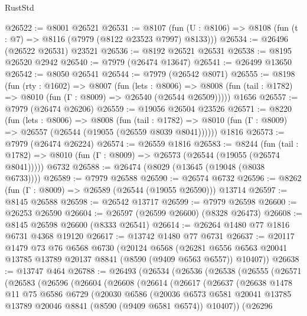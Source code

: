 \begin{lexlean}{RustStd}
\begin{coremodule}
@26522 := @8001 @26521
@26531 := @8107
    (fun (U : @8106) => @8108 (fun (t : @7) => @8116 (@7979 (@8122 @23523 @7997) @8133)))
@26534 := @26496 (@26522 @26531) @23521
@26536 := @8192 @26521 @26531
@26538 := @8195 @26520 @2942
@26540 := @7979 (@26474 @13647)
@26541 := @26499 @13650
@26542 := @8050 @26541
@26544 := @7979 (@26542 @8071)
@26555 := @8198
    (fun (rty : @1602) =>
    @8007
      (fun (lets : @8006) =>
      @8008 (fun (tail : @1782) => @8010 (fun (Γ : @8009) => @26540 (@26544 @26509)))))
    @1656
@26557 := @7979 (@26474 @26206)
@26559 := @19056 @26504 @23526
@26571 := @8220
    (fun (lets : @8006) =>
    @8008
      (fun (tail : @1782) =>
      @8010 (fun (Γ : @8009) => @26557 (@26544 (@19055 (@26559 @8039 @8041))))))
    @1816
@26573 := @7979 (@26474 @26224)
@26574 := @26559 @1816
@26583 := @8244
    (fun (tail : @1782) => @8010 (fun (Γ : @8009) => @26573 (@26544 (@19055 (@26574 @8041)))))
    @6732
@26588 := @26474 (@8029 (@13645 (@19048 (@8038 @6733))))
@26589 := @7979 @26588
@26590 := @26574 @6732
@26596 := @8262 (fun (Γ : @8009) => @26589 (@26544 (@19055 @26590))) @13714
@26597 := @8145 @26588
@26598 := @26542 @13717
@26599 := @7979 @26598
@26600 := @26253 @26590
@26604 := @26597 (@26599 @26600) (@8328 @26473)
@26608 := @8145 @26598 @26600 (@8333 @26541)
@26614 := @26264 @1480 @77 @1816 @6731 @4368 @19120
@26617 := @13742 @1480 @77 @6731
@26637 := @20117
    @1479
    @73
    @76
    @6568
    @6730
    (@20124
      @6568
      (@26281 @6556 @6563 @20041 @13785 @13789 @20137 @8841 (@8590 (@9409 @6563 @6557)) @10407))
@26638 := @13747 @464
@26788 := @26493
    (@26534
      (@26536
        (@26538
          (@26555
            (@26571
              (@26583
                (@26596
                  (@26604
                    (@26608
                      (@26614
                        (@26617
                          (@26637
                            (@26638
                              @1478
                              @11
                              @75
                              @6586
                              @6729
                              (@20030
                                @6586
                                (@20036
                                  @6573
                                  @6581
                                  @20041
                                  @13785
                                  @13789
                                  @20046
                                  @8841
                                  (@8590 (@9409 @6581 @6574))
                                  @10407))
                              (@26296

\end{coremodule}
\end{lexlean}
